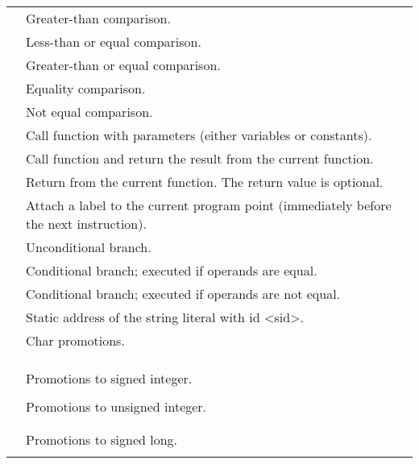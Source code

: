 \documentclass[../00-main.tex]{subfiles}
\begin{document}
\begin{xltabular}{\textwidth}{lX}
 & Greater-than comparison. \\
 & Less-than or equal comparison. \\
 & Greater-than or equal comparison. \\
 & Equality comparison. \\
 & Not equal comparison. \\
\midrule
{} & Call function  with parameters  (either variables or constants). \\
 & Call function  and return the result from the current function. \\
 & Return from the current function. The return value  is optional. \\
\midrule
{} & Attach a label to the current program point (immediately before the next instruction). \\
 & Unconditional branch. \\
 & Conditional branch; executed if operands are equal. \\
 & Conditional branch; executed if operands are not equal. \\
\midrule
{} & Static address of the string literal with id <sid>. \\
\midrule
{} & Char promotions. \\
 &  \\
 &  \\
 &  \\
\midrule
{} & Promotions to signed integer. \\
 &  \\
\midrule
{} & Promotions to unsigned integer. \\
 &  \\
 &  \\
\midrule
{} & Promotions to signed long. \\
 &  \\

\end{xltabular}
\end{document}

